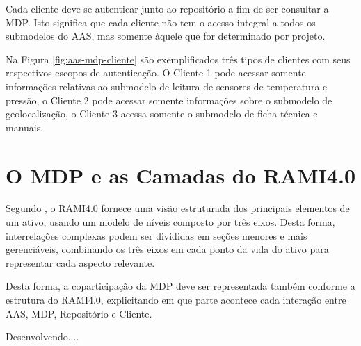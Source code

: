 	Cada cliente deve se autenticar junto ao repositório a fim de ser consultar a MDP. Isto significa que cada cliente não tem o acesso integral a todos os submodelos do AAS, mas somente àquele que for determinado por projeto.
	
	Na Figura \ref{fig:aas-mdp-cliente} são exemplificados três tipos de clientes com seus respectivos escopos de autenticação. O Cliente 1 pode acessar somente informações relativas ao submodelo de leitura de sensores de temperatura e pressão, o Cliente 2 pode acessar somente informações sobre o submodelo de geolocalização, o Cliente 3 acessa somente o submodelo de ficha técnica e manuais.
	
	
	
	\section{O MDP e as Camadas do RAMI4.0}

	Segundo , o RAMI4.0 fornece uma visão estruturada dos principais elementos de um ativo, usando um modelo de níveis composto por três eixos. Desta forma, interrelações complexas podem ser divididas em seções menores e mais gerenciáveis, combinando os três eixos em cada ponto da vida do ativo para representar cada aspecto relevante.
	
	Desta forma, a coparticipação da MDP deve ser representada também conforme a estrutura do RAMI4.0, explicitando em que parte acontece cada interação entre AAS, MDP, Repositório e Cliente.
	
	
	Desenvolvendo....